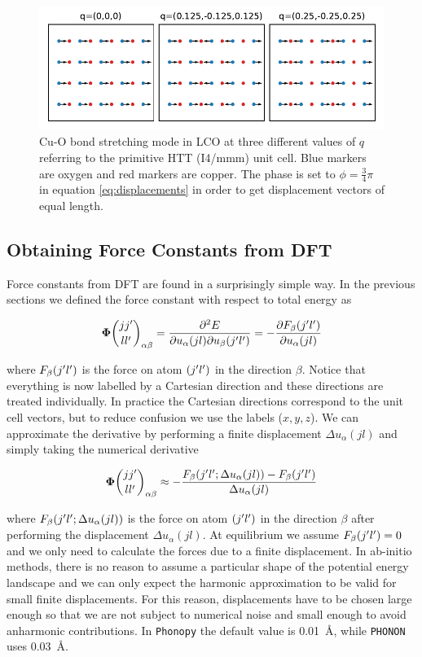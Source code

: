 \begin{figure}
	\centering
	\includegraphics{fig/temp/bs-phonons.pdf}
	\caption[bond-stretching phonons visualized]{Cu-O bond stretching mode in LCO at three different values of $q$ referring to the primitive HTT (I4/mmm) unit cell. Blue markers are oxygen and red markers are copper. The phase is set to $\phi=\frac{3}{4}\pi$ in equation \ref{eq:displacements} in order to get displacement vectors of equal length.}
	\label{fig:bs-displacements}
\end{figure}

\subsection{Obtaining Force Constants from DFT}\label{sec:forceDFT}
Force constants from DFT are found in a surprisingly simple way. In the previous sections we defined the force constant with respect to total energy as

\[ \fc  _{\alpha \beta} = \frac{\partial ^2 E}{\partial u_\alpha (jl) \partial u_\beta (\jp \lp)} = - \frac{\partial F_\beta (\jp \lp)}{\partial u_\alpha (jl)} \]

\noindent where $F_\beta (j^\prime l^\prime)$ is the force on atom $(j^\prime l^\prime)$ in the direction $\beta$. Notice that everything is now labelled by a Cartesian direction and these directions are treated individually. In practice the Cartesian directions correspond to the unit cell vectors, but to reduce confusion we use the labels ($x,y,z$). We can approximate the derivative by performing a finite displacement $\Delta u_\alpha(jl)$ and simply taking the numerical derivative


\begin{equation}
\fc _{\alpha \beta} \approx - \frac{F_\beta (\jp \lp; \Delta u_\alpha (jl)) - F_\beta (\jp\lp)}{\Delta u_\alpha (jl)} \label{eq:finite}
\end{equation}


\noindent where $F_\beta (j^\prime l^\prime;\Delta u_\alpha (jl))$ is the force on atom $(j^\prime l^\prime)$ in the direction $\beta$ after performing the displacement $\Delta u_\alpha (jl)$. At equilibrium we assume $F_\beta (j^\prime l^\prime) = 0$ and we only need to calculate the forces due to a finite displacement. In ab-initio methods, there is no reason to assume a particular shape of the potential energy landscape and we can only expect the harmonic approximation to be valid for small finite displacements. For this reason, displacements have to be chosen large enough so that we are not subject to numerical noise and small enough to avoid anharmonic contributions. In \texttt{Phonopy} the default value is \SI{0.01}{\angstrom}, while \texttt{PHONON} uses \SI{0.03}{\angstrom}.

